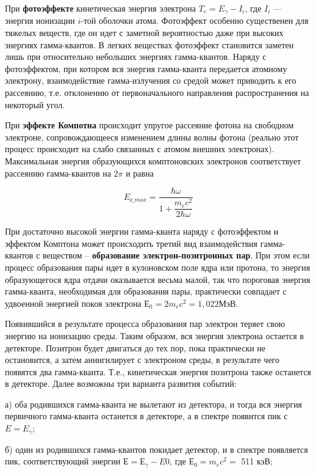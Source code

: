 \documentclass[12pt]{kiarticle}
\newcommand{\ga}{\ensuremath{\gamma}}
\begin{document}
	При \textbf{фотоэффекте} кинетическая энергия электрона $ T_e = E_\ga - I_i $, где $ I_i $ --- энергия ионизации $ i $-той оболочки атома. Фотоэффект особенно существенен для тяжелых веществ, где он идет с заметной вероятностью даже при высоких энергиях гамма-квантов. В легких веществах фотоэффект становится заметен лишь при относительно небольших энергиях гамма-квантов. Наряду с фотоэффектом, при котором вся энергия гамма-кванта передается атомному электрону, взаимодействие гамма-излучения со средой может приводить к его рассеянию, т.е. отклонению от первоначального направления распространения на некоторый угол.
	
	При \textbf{эффекте Компотна} происходит упругое рассеяние фотона на свободном электроне, сопровождающееся изменением длины волны фотона (реально этот процесс происходит на слабо связанных с атомом внешних электронах). Максимальная энергия образующихся комптоновских электронов соответствует рассеянию гамма-квантов на $ 2\pi $ и равна
	
	\begin{equation}\label{E_compton}
	E_{с \_ max} = \dfrac{\hbar \omega}{1 + \dfrac{m_ec^2}{2\hbar\omega}}
	\end{equation}
	
	При достаточно высокой энергии гамма-кванта наряду с фотоэффектом и эффектом Комптона может происходить третий вид взаимодействия гамма-квантов с веществом – \textbf{образование электрон-позитронных пар}. При этом если процесс образования пары идет в кулоновском поле ядра или протона, то энергия образующегося ядра отдачи оказывается весьма малой, так что пороговая энергия гамма-кванта, необходимая для образования пары, практически совпадает с удвоенной энергией покоя электрона $ Е_0 = 2m_ec^2 =1,022  $МэВ.
	
	Появившийся в результате процесса образования пар электрон теряет свою энергию на ионизацию среды. Таким образом, вся энергия электрона остается в детекторе. Позитрон будет двигаться до тех пор, пока практически не остановится, а затем аннигилирует с электроном среды, в результате чего появятся два гамма-кванта. Т.е., кинетическая энергия позитрона также останется в детекторе. Далее возможны три варианта развития событий:
	
	а) оба родившихся гамма-кванта не вылетают из детектора, и тогда вся энергия первичного гамма-кванта останется в детекторе, а в спектре появится пик с $ E = E_\gamma $;
	
	б) один из родившихся гамма-квантов покидает детектор, и в спектре появляется пик, соответствующий энергии $  Е = Е_\gamma - E0 $, где $ Е_0 = m_ec^2 = $ 511 кэВ;
	
\end{document}
